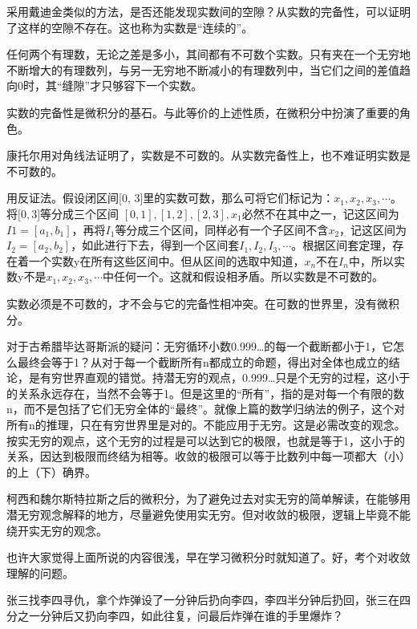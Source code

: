 \songti
\setlength{\leftskip}{0em}
采用戴迪金类似的方法，是否还能发现实数间的空隙？从实数的完备性，可以证明了这样的空隙不存在。这也称为实数是``连续的''。

任何两个有理数，无论之差是多小，其间都有不可数个实数。只有夹在一个无穷地不断增大的有理数列，与另一无穷地不断减小的有理数列中，当它们之间的差值趋向0时，其``缝隙''才只够容下一个实数。

实数的完备性是微积分的基石。与此等价的上述性质，在微积分中扮演了重要的角色。

康托尔用对角线法证明了，实数是不可数的。从实数完备性上，也不难证明实数是不可数的。

\kaishu
\setlength{\leftskip}{1em}
用反证法。假设闭区间[0, 3]里的实数可数，那么可将它们标记为：$ x_1, x_2, x_3, \cdots  $。将$ [0, 3 $]等分成三个区间 $ [0, 1], [1, 2], [2, 3], x_1 $必然不在其中之一，记这区间为$ I1 = [a_1, b_1] $，再将$ I_1 $等分成三个区间，同样必有一个子区间不含$ x_2 $，记这区间为$ I_2 = [a_2, b_2] $，如此进行下去，得到一个区间套$ I_1, I_2, I_3, \cdots $。根据区间套定理，存在着一个实数y在所有这些区间中。但从区间的选取中知道，$ x_n $不在$ I_n $中，所以实数y不是$ x_1, x_2, x_3, \cdots $中任何一个。这就和假设相矛盾。所以实数是不可数的。

\songti
\setlength{\leftskip}{0em}
实数必须是不可数的，才不会与它的完备性相冲突。在可数的世界里，没有微积分。

对于古希腊毕达哥斯派的疑问：无穷循环小数0.999…的每一个截断都小于1，它怎么最终会等于1？从对于每一个截断所有n都成立的命题，得出对全体也成立的结论，是有穷世界直观的错觉。持潜无穷的观点，0.999…只是个无穷的过程，这小于的关系永远存在，当然不会等于1。但是这里的``所有''，指的是对每一个有限的数n，而不是包括了它们无穷全体的``最终''。就像上篇的数学归纳法的例子，这个对所有n的推理，只在有穷世界里是对的。不能应用于无穷。这是必需改变的观念。按实无穷的观点，这个无穷的过程是可以达到它的极限，也就是等于1，这小于的关系，因达到极限而终结为相等。收敛的极限可以等于比数列中每一项都大（小）的上（下）确界。

柯西和魏尔斯特拉斯之后的微积分，为了避免过去对实无穷的简单解读，在能够用潜无穷观念解释的地方，尽量避免使用实无穷。但对收敛的极限，逻辑上毕竟不能绕开实无穷的观念。

也许大家觉得上面所说的内容很浅，早在学习微积分时就知道了。好，考个对收敛理解的问题。

\kaishu
\setlength{\leftskip}{1em}

张三找李四寻仇，拿个炸弹设了一分钟后扔向李四，李四半分钟后扔回，张三在四分之一分钟后又扔向李四，如此往复，问最后炸弹在谁的手里爆炸？

